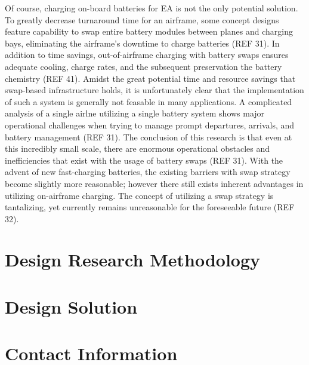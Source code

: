 \documentclass{article}
\begin{document}
Of course, charging on-board batteries for EA is not the only potential solution. 
To greatly decrease turnaround time for an airframe, some concept designs feature capability to swap entire battery modules between planes and charging bays, eliminating the airframe’s downtime to charge batteries (REF 31). 
In addition to time savings, out-of-airframe charging with battery swaps ensures adequate cooling, charge rates, and the subsequent preservation the battery chemistry (REF 41). 
Amidst the great potential time and resource savings that swap-based infrastructure holds, it is unfortunately clear that the implementation of such a system is generally not feasable in many applications. 
A complicated analysis of a single airlne utilizing a single battery system shows major operational challenges when trying to manage prompt departures, arrivals, and battery management (REF 31). 
The conclusion of this research is that even at this incredibly small scale, there are enormous operational obstacles and inefficiencies that exist with the usage of battery swaps (REF 31). 
With the advent of new fast-charging batteries, the existing barriers with swap strategy become slightly more reasonable; however there still exists inherent advantages in utilizing on-airframe charging.  
The concept of utilizing a swap strategy is tantalizing, yet currently remains unreasonable for the foreseeable future (REF 32).\par



\newpage

\newpage

\section{Design Research Methodology}\label{designReview}
\blindtext

\section{Design Solution}\label{solution}
\blindtext 


\newpage
\appendixpage
\appendix
\section{Contact Information}\label{apxA}
\end{document}
